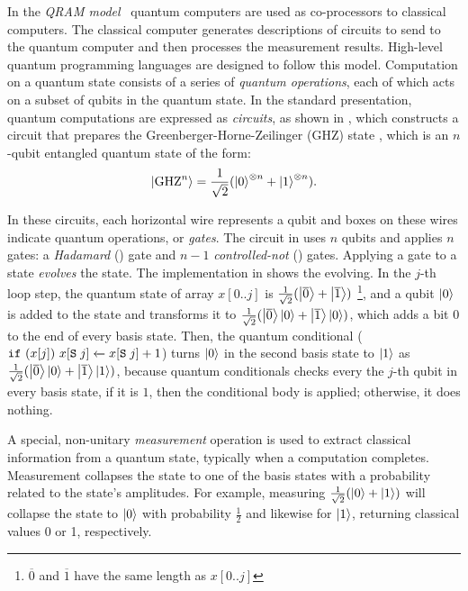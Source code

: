  In the \emph{QRAM model}~\cite{Knill1996} quantum computers are used as co-processors to classical computers. The classical computer generates descriptions of circuits to send to the quantum computer and then processes the measurement results. High-level quantum programming languages are designed to follow this model.
Computation on a quantum state consists of a series of \emph{quantum operations}, each of which acts on a subset of qubits in the quantum state. In the standard presentation, quantum computations are expressed as \emph{circuits}, as shown in , which constructs a circuit that prepares the Greenberger-Horne-Zeilinger (GHZ) state \cite{Greenberger1989}, which is an $n$-qubit entangled quantum state of the form:
\begin{align*}
    \left\vert{\text{GHZ}^n}\right\rangle = \frac{1}{\sqrt{2}}(\left\vert{0}\right\rangle^{\otimes n}+\left\vert{1}\right\rangle^{\otimes n}).
\end{align*}

In these circuits, each horizontal wire represents a qubit and boxes on these wires indicate quantum operations, or \emph{gates}. The circuit in  uses $n$ qubits and applies $n$ gates: a \emph{Hadamard} () gate and $n-1$ \emph{controlled-not} () gates.
Applying a gate to a state \emph{evolves} the state. 
The \qafny implementation in  shows the evolving. In the $j$-th loop step, the quantum state of array $x[0..j]$ is $\frac{1}{\sqrt{2}}(\left\vert{\overline{0}}\right\rangle+\left\vert{\overline{1}}\right\rangle)$ \footnote{$\overline{0}$ and $\overline{1}$ have the same length as $x[0..j]$}, and a qubit $\left\vert{0}\right\rangle$ is added to the state and transforms it to $\frac{1}{\sqrt{2}}(\left\vert{\overline{0}}\right\rangle\left\vert{0}\right\rangle+\left\vert{\overline{1}}\right\rangle\left\vert{0}\right\rangle)$, which adds a bit $0$ to the end of every basis state. Then, the quantum conditional 
($\texttt{if}~{(x[j])}~{{x[\texttt{S}\;j]} \xleftarrow{} {x[\texttt{S}\;j]+1}}$) turns $\left\vert{0}\right\rangle$ in the second basis state to $\left\vert{1}\right\rangle$ as $\frac{1}{\sqrt{2}}(\left\vert{\overline{0}}\right\rangle\left\vert{0}\right\rangle+\left\vert{\overline{1}}\right\rangle\left\vert{1}\right\rangle)$, because quantum conditionals checks every the $j$-th qubit in every basis state, if it is $1$, then the conditional body is applied; otherwise, it does nothing.

 A special, non-unitary \emph{measurement} operation is used to extract classical information from a quantum state, typically when a computation completes. Measurement collapses the state to one of the basis states with a probability related to the state's amplitudes. For example, measuring $\frac{1}{\sqrt{2}}(\left\vert{0}\right\rangle + \left\vert{1}\right\rangle)$ will collapse the state to $\left\vert{0}\right\rangle$ with probability $\frac{1}{2}$ and likewise for $\left\vert{1}\right\rangle$, returning classical values 0 or 1, respectively.

